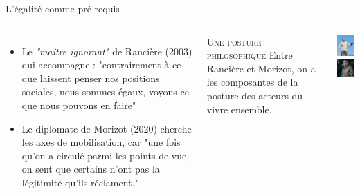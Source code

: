 \documentclass[newPxFont]{beamer}
\begin{document}
\begin{frame}[c]{L'égalité comme pré-requis}
  \vspace{-1cm}
  \begin{columns}[onlytextwidth,T]
    \column{\dimexpr\linewidth-30mm-5mm}
        \begin{itemize}
          \item Le \textit{"maître ignorant"} de Rancière (2003) qui accompagne : "contrairement à ce que laissent penser nos positions sociales, nous sommes égaux, voyons ce que nous pouvons en faire"
          \item Le diplomate de Morizot (2020) cherche les axes de mobilisation, car "une fois qu’on a circulé parmi les points de vue, on sent que certains n’ont pas la légitimité qu’ils réclament."
        \end{itemize}

        \small{
            \begin{alertblock}{\textsc{Une posture philosophique}}
              Entre Rancière et Morizot, on a les composantes de la posture des acteurs du vivre ensemble.
            \end{alertblock}
          }
    \column{30mm}
    \vspace{0.5cm}
          \includegraphics[width=3cm]{img/Ranciere.jpg}\\
          \includegraphics[width=3cm]{img/morizot.jpg}
  \end{columns}
\end{frame}
\end{document}
